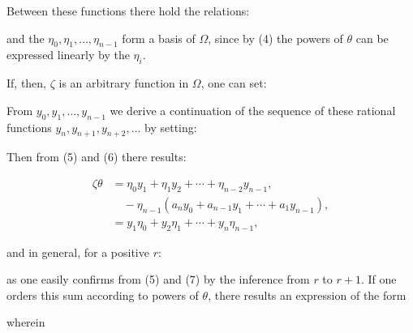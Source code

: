
Between these functions there hold the relations:


and the $\eta_0, \eta_1, \ldots, \eta_{n-1}$ form a basis of $\Omega$, since by
(4) the powers of $\theta$ can be expressed linearly by the $\eta_i$.

If, then, $\zeta$ is an arbitrary function in $\Omega$, one can set:


From $y_0, y_1, \ldots, y_{n-1}$ we derive a continuation of the sequence of these rational
functions $y_n, y_{n+1}, y_{n+2}, \ldots$ by setting:


Then from (5) and (6) there results:

\[
\begin{aligned}
\zeta\theta &= \eta_0 y_1 + \eta_1 y_2 + \cdots + \eta_{n-2}y_{n-1}, \\
&\quad - \eta_{n-1}(a_n y_0 + a_{n-1}y_1 + \cdots + a_1 y_{n-1}), \\
&= y_1\eta_0 + y_2\eta_1 + \cdots + y_n\eta_{n-1},
\end{aligned}
\]

and in general, for a positive $r$:


as one easily confirms from (5) and (7) by the inference from $r$ to $r+1$.
If one orders this sum according to powers of $\theta$, there results an expression of the
form


wherein

